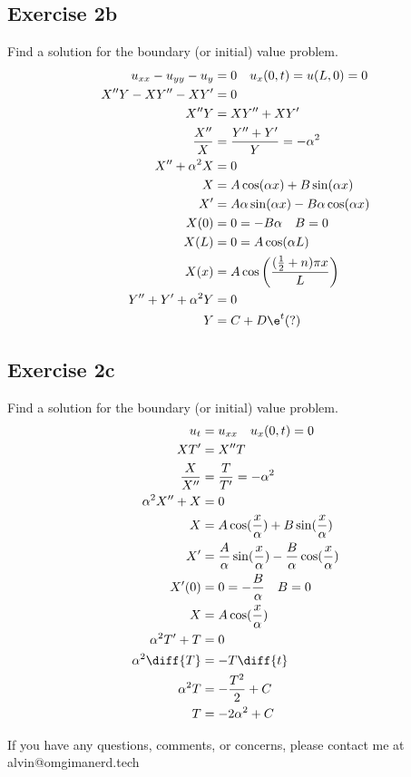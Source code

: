 \documentclass{math}
\begin{document}
\subsection*{Exercise 2b}
Find a solution for the boundary (or initial) value problem.
\begin{align*}
  u_{xx}-u_{yy}-u_y &= 0 \quad u_x(0,t) = u(L,0) = 0 \\
  X''Y-XY''-XY' &= 0 \\
  X''Y &= XY''+XY' \\
  \frac{X''}{X} &= \frac{Y''+Y'}{Y} = -\alpha^2 \\
  X''+\alpha^2X &= 0 \\
  X &= A\cos(\alpha x)+B\sin(\alpha x) \\
  X' &= A\alpha\sin(\alpha x)-B\alpha\cos(\alpha x) \\
  X(0) &= 0 = -B\alpha \quad B = 0 \\
  X(L) &= 0 = A\cos(\alpha L) \\
  X(x) &= A\cos\left(\frac{(\frac{1}{2}+n)\pi x}{L}\right) \\
  Y''+Y'+\alpha^2Y &= 0 \\
  Y &= C+D\e^t (?) \\
\end{align*}

\subsection*{Exercise 2c}
Find a solution for the boundary (or initial) value problem.
\begin{align*}
  u_t &= u_{xx} \quad u_x(0,t) = 0 \\
  XT' &= X''T \\
  \frac{X}{X''} &= \frac{T}{T'} = -\alpha^2 \\
  \alpha^2X''+X &= 0 \\
  X &= A\cos(\frac{x}{\alpha})+B\sin(\frac{x}{\alpha}) \\
  X' &= \frac{A}{\alpha}\sin(\frac{x}{\alpha})-
    \frac{B}{\alpha}\cos(\frac{x}{\alpha}) \\
  X'(0) &= 0 = -\frac{B}{\alpha} \quad B = 0 \\
  X &= A\cos(\frac{x}{\alpha}) \\
  \alpha^2T'+T &= 0 \\
  \alpha^2\diff{T} &= -T\diff{t} \\
  \alpha^2T &= -\frac{T^2}{2}+C \\
  T &= -2\alpha^2+C
\end{align*}

\begin{center}
  If you have any questions, comments, or concerns, please contact me at
  alvin@omgimanerd.tech
\end{center}
\end{document}
